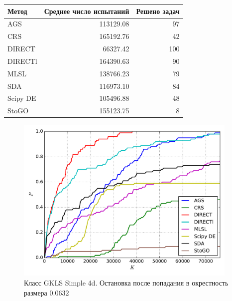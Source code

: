 \documentclass[a4paper]{article}
\begin{document}
\begin{tabular}{lrr}
\hline
 Метод    &   Среднее число испытаний &   Решено задач \\
\hline
 AGS      &                 113129.08 &             97 \\
 CRS      &                 165192.76 &             42 \\
 DIRECT   &                  66327.42 &            100 \\
 DIRECTl  &                 164390.63 &             90 \\
 MLSL     &                 138766.23 &             79 \\
 SDA      &                 116973.10 &             84 \\
 Scipy DE &                 105496.88 &             48 \\
 StoGO    &                 155123.75 &              8 \\
\hline
\end{tabular}
\begin{figure}[H]
  \center
  \includegraphics[width=0.95\textwidth]{../experiments/gklss4d/cmc.pdf}
  \caption{Класс GKLS Simple 4d. Остановка после попадания в окрестность размера $0.0632$}
  \label{fig:}
\end{figure}
\end{document}
